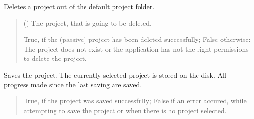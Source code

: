 \documentclass[letterpaper,10pt,english]{sphinxmanual}
\begin{document}
\begin{fulllineitems}
\begin{fulllineitems}
\begin{quote}
\begin{description}
\end{description}\end{quote}

\end{fulllineitems}


\begin{fulllineitems}
\label{\detokenize{apidoc/src.osm_configurator.control:src.osm_configurator.control.project_controller.ProjectController.delete_passive_project}}
\pysigstartsignatures
{}
\pysigstopsignatures
\sphinxAtStartPar
Deletes a project out of the default project folder.
\begin{quote}\begin{description}
\sphinxAtStartPar
{} ({\hyperref[\detokenize{apidoc/src.osm_configurator.model.application:src.osm_configurator.model.application.passive_project.PassiveProject}]{}}) \textendash{} The project, that is going to be deleted.

\sphinxAtStartPar
True, if the (passive) project has been deleted successfully; False otherwise: The project does not exist or the application has not the right permissions to delete the project.

\sphinxAtStartPar
{}

\end{description}\end{quote}

\end{fulllineitems}


\begin{fulllineitems}
\label{\detokenize{apidoc/src.osm_configurator.control:src.osm_configurator.control.project_controller.ProjectController.save_project}}
\pysigstartsignatures
{}
\pysigstopsignatures
\sphinxAtStartPar
Saves the project.
The currently selected project is stored on the disk. All progress made since the last saving are saved.
\begin{quote}\begin{description}
\sphinxAtStartPar
True, if the project was saved successfully; False if an error accured, while attempting to save the project or when there is no project selected.


\end{description}
\end{quote}
\end{fulllineitems}
\end{fulllineitems}
\end{document}
